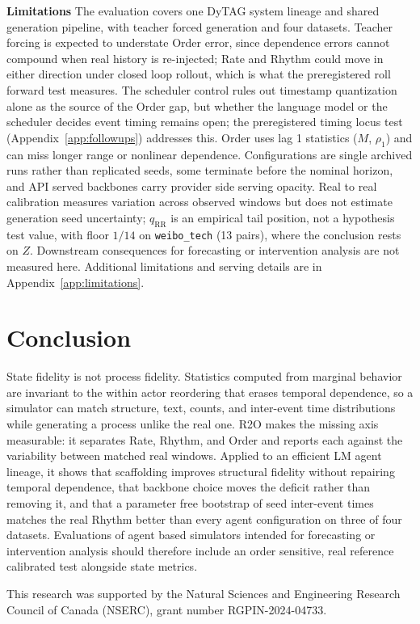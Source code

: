 \documentclass{article}
\begin{document}
\noindent \textbf{Limitations}\label{sec:limitations}
The evaluation covers one DyTAG system lineage and shared generation pipeline,
with teacher forced generation and four datasets. Teacher forcing is expected to
understate Order error, since dependence errors cannot compound when real
history is re-injected; Rate and Rhythm could move in either direction under
closed loop rollout, which is what the preregistered roll forward test
measures. The scheduler control rules out timestamp quantization alone as the
source of the Order gap, but whether the language model or the scheduler
decides event timing remains open; the preregistered timing locus test
(Appendix~\ref{app:followups}) addresses this. Order uses lag 1 statistics ($M$, $\rho_1$) and can miss longer
range or nonlinear dependence. Configurations are single archived runs rather
than replicated seeds, some terminate before the nominal horizon, and API
served backbones carry provider side serving opacity. Real to real calibration
measures variation across observed windows but does not estimate generation
seed uncertainty; $q_{\mathrm{RR}}$ is an empirical tail position, not a
hypothesis test value, with floor $1/14$ on \texttt{weibo\_tech} (13 pairs),
where the conclusion rests on $Z$. Downstream consequences for forecasting or
intervention analysis are not measured here. Additional limitations and
serving details are in Appendix~\ref{app:limitations}.

\section{Conclusion}
State fidelity is not process fidelity. Statistics computed from marginal
behavior are invariant to the within actor reordering that erases temporal
dependence, so a simulator can match structure, text, counts, and inter-event
time distributions while generating a process unlike the real one. R2O makes
the missing axis measurable: it separates Rate, Rhythm, and Order and reports
each against the variability between matched real windows. Applied to an
efficient LM agent lineage, it shows that scaffolding improves structural
fidelity without repairing temporal dependence, that backbone choice moves the
deficit rather than removing it, and that a parameter free bootstrap of seed
inter-event times matches the real Rhythm better than every agent
configuration on three of four datasets. Evaluations of agent based simulators
intended for forecasting or intervention analysis should therefore include an
order sensitive, real reference calibrated test alongside state metrics.

\begin{ack}
This research was supported by the Natural Sciences and Engineering Research
Council of Canada (NSERC), grant number RGPIN-2024-04733.
\end{ack}

\clearpage



\clearpage


\clearpage

\end{document}
